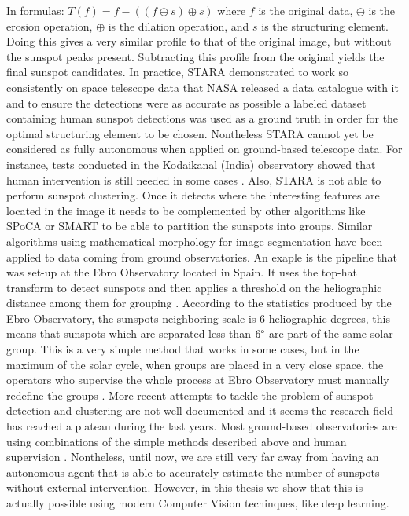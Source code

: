 \bigbreak
\noindent In formulas: $T(f) = f - ((f \ominus  s) \oplus  s)$ where $f$ is the original data, $\ominus$ is the erosion operation, $\oplus$ is the dilation operation, and $s$ is the structuring element. Doing this gives a very similar profile to that of the original image, but without the sunspot peaks present. Subtracting this profile from the original yields the final sunspot candidates. In practice, STARA demonstrated to work so consistently on space telescope data that NASA released a data catalogue with it and to ensure the detections were as accurate as possible a labeled dataset containing human sunspot detections was used as a ground truth in order for the optimal structuring element to be chosen.
\bigbreak
\noindent Nontheless STARA cannot yet be considered as fully autonomous when applied on ground-based telescope data. For instance, tests conducted in the Kodaikanal (India) observatory showed that human intervention is still needed in some cases \cite{ravindra2013digitized}. Also, STARA is not able to perform sunspot clustering. Once it detects where the interesting features are located in the image it needs to be complemented by other algorithms like SPoCA or SMART to be able to partition the sunspots into groups.
\bigbreak
\noindent Similar algorithms using mathematical morphology for image segmentation have been applied to data coming from ground observatories. An exaple is the pipeline that was set-up at the Ebro Observatory \cite{ebro-observatory} located in Spain. It uses the top-hat transform to detect sunspots and then applies a threshold on the heliographic distance among them for grouping \cite{curto2003automatic}. According to the statistics produced by the Ebro Observatory, the sunspots neighboring scale is 6 heliographic degrees, this means that sunspots which are separated less than $6\degree$ are part of the same solar group. This is a very simple method that works in some cases, but in the maximum of the solar cycle, when groups are placed in a very close space, the operators who supervise the whole process at Ebro Observatory must manually redefine the groups \cite{curto2003automatic}.
\bigbreak
\noindent More recent attempts to tackle the problem of sunspot detection and clustering are not well documented and it seems the research field has reached a plateau during the last years. Most ground-based observatories are using combinations of the simple methods described above and human supervision \cite{pucha2016development}. Nontheless, until now, we are still very far away from having an autonomous agent that is able to accurately estimate the number of sunspots without external intervention. However, in this thesis we show that this is actually possible using modern Computer Vision techinques, like deep learning.
